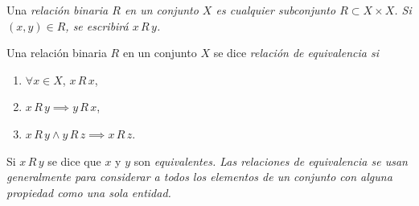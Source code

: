 
\begin{definition}
Una \itshape{relación binaria} $R$ en un conjunto $X$ es cualquier subconjunto $R \subset X \times X$. Si $(x,y) \in R$, se escribirá $x \, R \, y$.
\end{definition}

\begin{definition}
Una relación binaria $R$ en un conjunto $X$ se dice \itshape{relación de equivalencia} si
\begin{enumerate}[label=\textnormal{(\roman*)}]
\item $\forall x \in X$, $x \, R \, x$,
\item $x \, R \, y \implies y \, R \, x$,
\item $x \, R \, y \land y \, R \, z \implies x \, R \, z$.
\end{enumerate}
Si $x \, R \, y$ se dice que $x$ y $y$ son \itshape{equivalentes}. Las relaciones de equivalencia se usan generalmente para considerar a todos los elementos de un conjunto con alguna propiedad como una sola entidad.
\end{definition}
